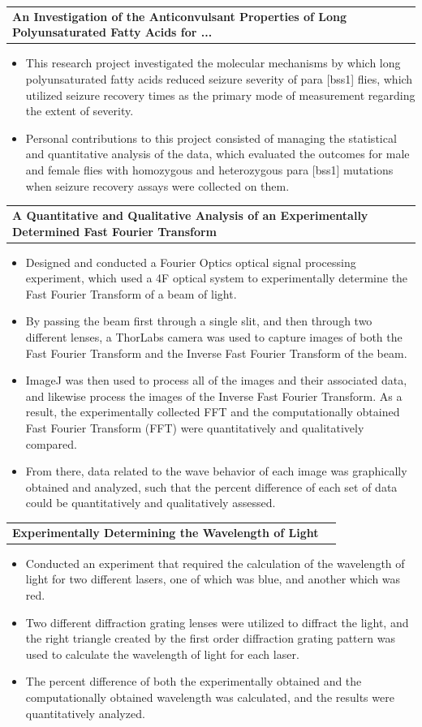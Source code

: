 \documentclass[letterpaper,11pt]{article}
\makeatletter
\newcommand{\resumeItem}[1]{
  \item\small{
    {#1 \vspace{-2pt}}
  }
}
\newcommand{\resumeProjectHeading}[2]{
    \vspace{-2pt}\item
    \begin{tabular*}{0.97\textwidth}{l@{\extracolsep{\fill}}r}
      \small#1 & #2 \\
    \end{tabular*}\vspace{-7pt}
}
\newcommand{\resumeItemListStart}{\begin{itemize}}
\newcommand{\resumeItemListEnd}{\end{itemize}\vspace{-5pt}}
\makeatother
\begin{document}
      \resumeProjectHeading
        {\textbf{An Investigation of the Anticonvulsant Properties of Long Polyunsaturated Fatty Acids for 
        ...}}{}
          \resumeItemListStart
            \resumeItem{This research project investigated the molecular mechanisms by which long polyunsaturated fatty acids reduced seizure severity of para [bss1] flies, 
            which utilized seizure recovery times as the primary mode of measurement regarding the extent of severity.}
            \resumeItem{Personal contributions to this project consisted of managing the statistical and quantitative analysis of the data, which evaluated the outcomes for male and female flies with homozygous 
            and heterozygous para [bss1] mutations when seizure recovery assays were collected on them.} %
          \resumeItemListEnd
      
      \resumeProjectHeading
        {\textbf{A Quantitative and Qualitative Analysis of an Experimentally Determined Fast Fourier Transform}}{}
          \resumeItemListStart
            \resumeItem{Designed and conducted a Fourier Optics optical signal processing experiment, which used a 4F optical system to experimentally determine the Fast Fourier Transform of a beam of light.}
            \resumeItem{By passing the beam first through a single slit, and then through two different lenses, a ThorLabs camera was used to capture images of 
            both the Fast Fourier Transform and the Inverse Fast Fourier Transform of the beam.}
            \resumeItem{ImageJ was then used to process all of the images and their associated data, and likewise process the images of the Inverse Fast Fourier Transform. As a result, the experimentally
            collected FFT and the computationally obtained Fast Fourier Transform (FFT) were quantitatively and qualitatively compared.}
            \resumeItem{From there, data related to the wave behavior of each image was graphically obtained and analyzed, such that the percent difference of each set of 
            data could be quantitatively and qualitatively assessed.}
          \resumeItemListEnd
      
      \resumeProjectHeading
        {\textbf{Experimentally Determining the Wavelength of Light}}{}
          \resumeItemListStart
            \resumeItem{Conducted an experiment that required the calculation of the wavelength of light for two different lasers, one of which was 
            blue, and another which was red.}
            \resumeItem{Two different diffraction grating lenses were utilized to diffract the light, and the right triangle created by the first order diffraction grating pattern 
            was used to calculate the wavelength of light for each laser.}
            \resumeItem{The percent difference of both the experimentally obtained and the computationally obtained wavelength was calculated, and the results were quantitatively analyzed.}
          \resumeItemListEnd
      
\end{document}
